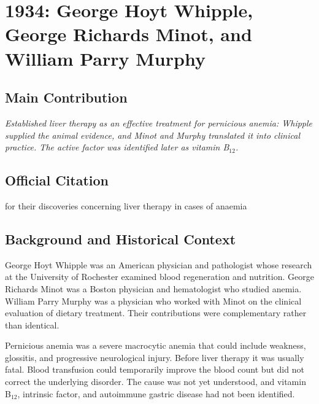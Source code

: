 \chapter[1934 --- Whipple et al.]{1934: George Hoyt Whipple, George Richards Minot, and William Parry Murphy}
\label{ch:1934_Whipple}

\section*{Main Contribution}

\textit{Established liver therapy as an effective treatment for pernicious anemia: Whipple supplied the animal evidence, and Minot and Murphy translated it into clinical practice. The active factor was identified later as vitamin B$_{12}$.}\cite{nobel-1934,lecture-1934}

\section{Official Citation}

for their discoveries concerning liver therapy in cases of anaemia\cite{nobel-1934}

\section{Background and Historical Context}

George Hoyt Whipple was an American physician and pathologist whose research at the University of Rochester examined blood regeneration and nutrition. George Richards Minot was a Boston physician and hematologist who studied anemia. William Parry Murphy was a physician who worked with Minot on the clinical evaluation of dietary treatment. Their contributions were complementary rather than identical.

Pernicious anemia was a severe macrocytic anemia that could include weakness, glossitis, and progressive neurological injury. Before liver therapy it was usually fatal. Blood transfusion could temporarily improve the blood count but did not correct the underlying disorder. The cause was not yet understood, and vitamin B$_{12}$, intrinsic factor, and autoimmune gastric disease had not been identified.

